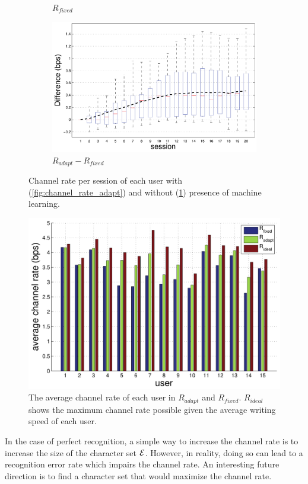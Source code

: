 \documentclass{sigchi}
\begin{document}
\begin{figure}
\begin{subfigure}[b]{\columnwidth}
    \caption{$R_{fixed}$}
    \label{fig:channel_rate_fixed}
  \end{subfigure}
  \begin{subfigure}[b]{\columnwidth}
    \includegraphics[width=\columnwidth]{figures/IUI_BPS_diff_p_first.pdf}
    \caption{$R_{adapt} - R_{fixed}$}
    \label{fig:channel_rate_diff}
  \end{subfigure}
  \label{fig:channel_rate}
  \caption{Channel rate per session of each user with
    (\ref{fig:channel_rate_adapt}) and without (\ref{fig:channel_rate_fixed})
    presence of machine learning. }
\end{figure}

\begin{figure}
  \centering
  \includegraphics[width=.5\textwidth]{figures/IUI_user_summary.pdf}   
  \caption{The average channel rate of each user in $R_{adapt}$ and
    $R_{fixed}$. $R_{ideal}$ shows the maximum channel rate possible given the
    average writing speed of each user. }
  \label{fig:channel_rate_per_user}
\end{figure}

In the case of perfect recognition, a simple way to increase the
channel rate is to increase the size of the character set
$\mathcal{E}$. However, in reality, doing so can lead to a
recognition error rate which impairs the channel rate. An interesting
future direction is to find a character set that would maximize the channel
rate. 
\end{document}
